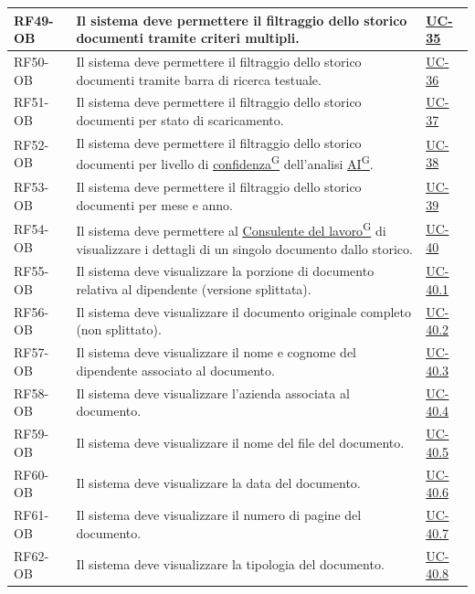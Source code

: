 ﻿\documentclass[a4paper,12pt]{article}
\providecommand{\glslink}[2]{\href{https://alittlebyte-19.github.io/Documentazione/glossario.html\#gls-#1}{\underline{#2}\textsuperscript{\scriptsize G}}}
\begin{document}
\begin{description}[style=multiline, leftmargin=4cm, font=\bfseries]
\begin{enumerate}[leftmargin=*, nosep]
{\begin{longtable}{|p{2.5cm}|p{9.5cm}|p{3.5cm}|}
    \hline
    RF49-OB & Il sistema deve permettere il filtraggio dello storico documenti tramite criteri multipli. & \hyperref[fig:uc-35]{UC-35} \\
    \hline
    RF50-OB & Il sistema deve permettere il filtraggio dello storico documenti tramite barra di ricerca testuale. & \hyperref[fig:uc-36]{UC-36} \\
    \hline
    RF51-OB & Il sistema deve permettere il filtraggio dello storico documenti per stato di scaricamento. & \hyperref[fig:uc-37]{UC-37} \\
    \hline
    RF52-OB & Il sistema deve permettere il filtraggio dello storico documenti per livello di \glslink{confidenza-confidence-score}{confidenza} dell'analisi \glslink{intelligenza-artificiale-ai}{AI}. & \hyperref[fig:uc-38]{UC-38} \\
    \hline
    RF53-OB & Il sistema deve permettere il filtraggio dello storico documenti per mese e anno. & \hyperref[fig:uc-39]{UC-39} \\
    \hline
    RF54-OB & Il sistema deve permettere al \glslink{consulente-del-lavoro-cdl}{Consulente del lavoro} di visualizzare i dettagli di un singolo documento dallo storico. & \hyperref[fig:uc-40]{UC-40} \\
    \hline
    RF55-OB & Il sistema deve visualizzare la porzione di documento relativa al dipendente (versione splittata). & \hyperref[fig:uc-40.1]{UC-40.1} \\
    \hline
    RF56-OB & Il sistema deve visualizzare il documento originale completo (non splittato). & \hyperref[fig:uc-40.2]{UC-40.2} \\
    \hline
    RF57-OB & Il sistema deve visualizzare il nome e cognome del dipendente associato al documento. & \hyperref[fig:uc-40.3]{UC-40.3} \\
    \hline
    RF58-OB & Il sistema deve visualizzare l'azienda associata al documento. & \hyperref[fig:uc-40.4]{UC-40.4} \\
    \hline
    RF59-OB & Il sistema deve visualizzare il nome del file del documento. & \hyperref[fig:uc-40.5]{UC-40.5} \\
    \hline
    RF60-OB & Il sistema deve visualizzare la data del documento. & \hyperref[fig:uc-40.6]{UC-40.6} \\
    \hline
    RF61-OB & Il sistema deve visualizzare il numero di pagine del documento. & \hyperref[fig:uc-40.7]{UC-40.7} \\
    \hline
    RF62-OB & Il sistema deve visualizzare la tipologia del documento. & \hyperref[fig:uc-40.8]{UC-40.8} \\

\end{longtable}}
\end{enumerate}
\end{description}
\end{document}
